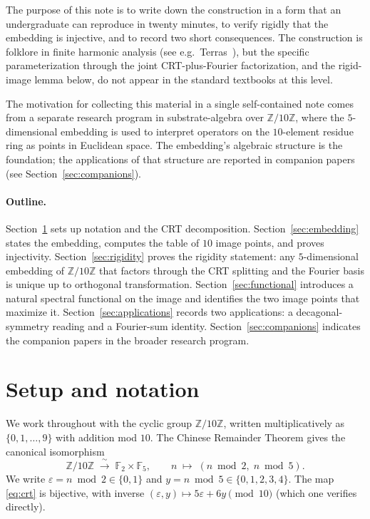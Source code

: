 \documentclass[11pt,reqno]{amsart}
\theoremstyle{definition}
\newcommand{\Z}{\mathbb{Z}}
\newcommand{\F}{\mathbb{F}}
\begin{document}
The purpose of this note is to write down the construction in a
form that an undergraduate can reproduce in twenty minutes, to
verify rigidly that the embedding is injective, and to record two
short consequences. The construction is folklore in finite
harmonic analysis (see e.g.~Terras~\cite{Terras1999}), but the
specific parameterization through the joint CRT-plus-Fourier
factorization, and the rigid-image lemma below, do not appear in
the standard textbooks at this level.

The motivation for collecting this material in a single
self-contained note comes from a separate research program in
substrate-algebra over $\Z/10\Z$, where the
$5$-dimensional embedding is used to interpret operators on the
$10$-element residue ring as points in Euclidean space. The
embedding's algebraic structure is the foundation; the applications
of that structure are reported in companion papers (see
Section~\ref{sec:companions}).

\paragraph{Outline.}
Section~\ref{sec:setup} sets up notation and the CRT decomposition.
Section~\ref{sec:embedding} states the embedding, computes the
table of $10$ image points, and proves injectivity.
Section~\ref{sec:rigidity} proves the rigidity statement: any
$5$-dimensional embedding of $\Z/10\Z$ that factors through the
CRT splitting and the Fourier basis is unique up to orthogonal
transformation.
Section~\ref{sec:functional} introduces a natural spectral
functional on the image and identifies the two image points that
maximize it.
Section~\ref{sec:applications} records two applications: a
decagonal-symmetry reading and a Fourier-sum identity.
Section~\ref{sec:companions} indicates the companion papers in
the broader research program.

\section{Setup and notation}
\label{sec:setup}

We work throughout with the cyclic group $\Z/10\Z$, written
multiplicatively as $\{0,1,\ldots,9\}$ with addition mod $10$. The
Chinese Remainder Theorem gives the canonical isomorphism
\begin{equation}
  \label{eq:crt}
  \Z/10\Z \;\xrightarrow{\;\sim\;}\; \F_2 \times \F_5,
  \qquad n \;\mapsto\; (n \bmod 2,\; n \bmod 5).
\end{equation}
We write $\varepsilon = n \bmod 2 \in \{0,1\}$ and
$y = n \bmod 5 \in \{0,1,2,3,4\}$. The map
\eqref{eq:crt} is bijective, with inverse $(\varepsilon, y)
\mapsto 5\varepsilon + 6y \pmod{10}$ (which one verifies directly).
\end{document}
